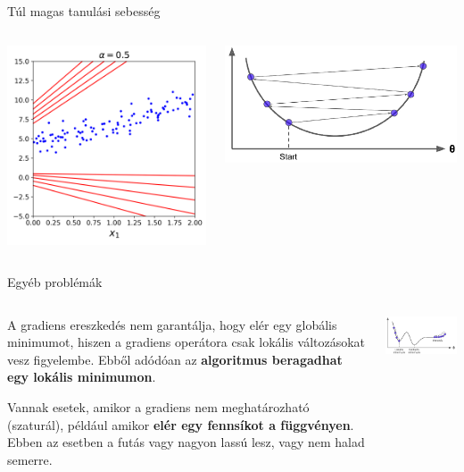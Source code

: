 \documentclass[english, aspectratio=169]{beamer}
\begin{document}
\begin{frame}{Túl magas tanulási sebesség}
\begin{columns}
\begin{column}{.5\textwidth}
\begin{center}
\includegraphics[width=6cm, keepaspectratio]{images/ql_19.png}
\end{center}
\end{column}
\begin{column}{.5\textwidth}
\begin{center}
\includegraphics[width=7cm, keepaspectratio]{images/ql_15.png}
\end{center}
\end{column}
\end{columns}
\end{frame}

\begin{frame}{Egyéb problémák}
\begin{columns}
\begin{column}{.5\textwidth}
A gradiens ereszkedés nem garantálja, hogy elér egy globális minimumot, hiszen a gradiens operátora csak lokális változásokat vesz figyelembe. Ebből adódóan az \textbf{algoritmus beragadhat egy lokális minimumon}.\par\medskip
Vannak esetek, amikor a gradiens nem meghatározható (szaturál), például amikor \textbf{elér egy fennsíkot a függvényen}. Ebben az esetben a futás vagy nagyon lassú lesz, vagy nem halad semerre. 
\end{column}
\begin{column}{.5\textwidth}
\begin{center}
\includegraphics[width=7cm, keepaspectratio]{images/ql_16.png}
\end{center}
\end{column}
\end{columns}
\end{frame}
\end{document}
